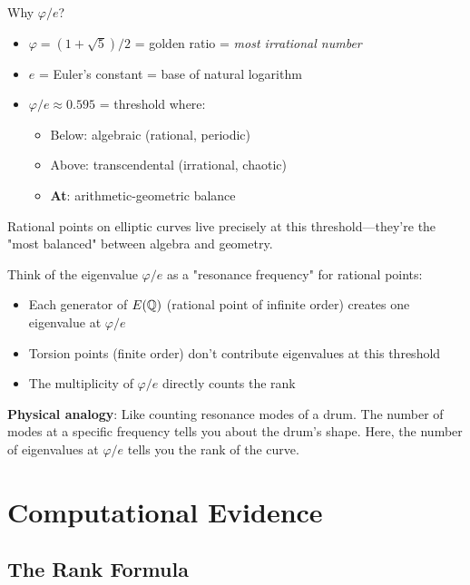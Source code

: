 \begin{keyidea}
Why $\varphi/e$?

\begin{itemize}
\item $\varphi = (1+\sqrt{5})/2$ = golden ratio = \textit{most irrational number}
\item $e$ = Euler's constant = base of natural logarithm
\item $\varphi/e \approx 0.595$ = threshold where:
  \begin{itemize}
  \item Below: algebraic (rational, periodic)
  \item Above: transcendental (irrational, chaotic)
  \item \textbf{At}: arithmetic-geometric balance
  \end{itemize}
\end{itemize}

Rational points on elliptic curves live precisely at this threshold—they're the "most balanced" between algebra and geometry.
\end{keyidea}

\begin{intuitive}
Think of the eigenvalue $\varphi/e$ as a "resonance frequency" for rational points:

\begin{itemize}
\item Each generator of $E(\mathbb{Q})$ (rational point of infinite order) creates one eigenvalue at $\varphi/e$
\item Torsion points (finite order) don't contribute eigenvalues at this threshold
\item The multiplicity of $\varphi/e$ directly counts the rank
\end{itemize}

\textbf{Physical analogy}: Like counting resonance modes of a drum. The number of modes at a specific frequency tells you about the drum's shape. Here, the number of eigenvalues at $\varphi/e$ tells you the rank of the curve.
\end{intuitive}

\section{Computational Evidence}

\subsection{The Rank Formula}

